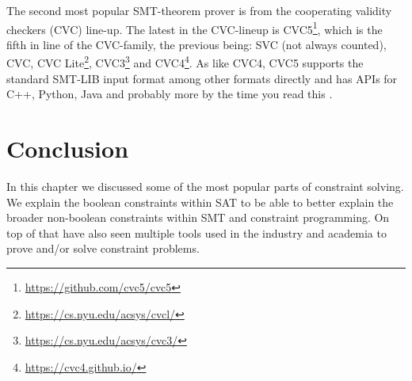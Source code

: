 The second most popular SMT-theorem prover is from the cooperating validity checkers (CVC) line-up. The latest in the CVC-lineup is CVC5\footnote{\url{https://github.com/cvc5/cvc5}}, which is the fifth in line of the CVC-family, the previous being: SVC (not always counted), CVC, 
CVC Lite\footnote{\url{https://cs.nyu.edu/acsys/cvcl/}}, 
CVC3\footnote{\url{https://cs.nyu.edu/acsys/cvc3/}}\cite{71barrett2007cvc3} and 
CVC4\footnote{\url{https://cvc4.github.io/}}.
As like CVC4, CVC5 supports the standard SMT-LIB input format among other formats directly and has APIs for C++, Python, Java and probably more by the time you read this \cite{62barrettcvc5, 63barbosa2022cvc5}.

\section{Conclusion}
\label{CS:conclusion}
In this chapter we discussed some of the most popular parts of constraint solving. We explain the boolean constraints within SAT to be able to better explain the broader non-boolean constraints within SMT and constraint programming. On top of that have also seen multiple tools used in the industry and academia to prove and/or solve constraint problems.

